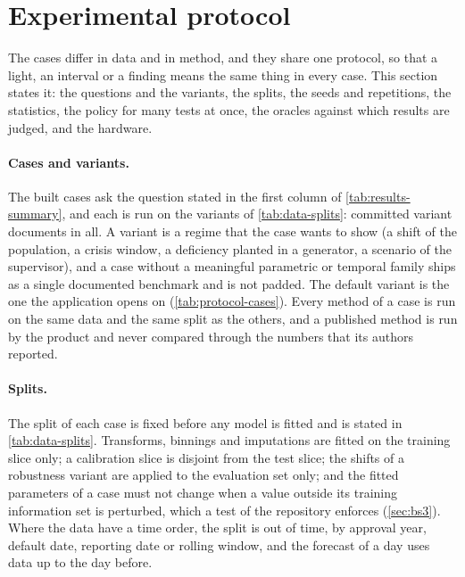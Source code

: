 \section{Experimental protocol}
\label{sec:protocol}

The cases differ in data and in method, and they share one protocol, so that a light, an interval or a finding means the same thing in every case. This section states it: the questions and the
variants, the splits, the seeds and repetitions, the statistics, the policy for many tests at once, the oracles against which results are judged, and the hardware.

\paragraph{Cases and variants.} The \rsCasesResult{} built cases ask the question stated in the first column of \cref{tab:results-summary}, and each is run on the variants of \cref{tab:data-splits}: \rsVariants{} committed variant documents in all. A variant is a regime
that the case wants to show (a shift of the population, a crisis window, a deficiency planted in a generator, a scenario of the supervisor), and a case without a meaningful parametric or temporal family ships as a single documented benchmark and is not padded. The default variant
is the one the application opens on (\cref{tab:protocol-cases}). Every method of a case is run on the same data and the same split as the others, and a published method is run by the product and never compared through the numbers that its authors reported.



\paragraph{Splits.} The split of each case is fixed before any model is fitted and is stated in \cref{tab:data-splits}. Transforms, binnings and imputations are fitted on the training slice only; a calibration slice is disjoint from the test slice; the shifts of a
robustness variant are applied to the evaluation set only; and the fitted parameters of a case must not change when a value outside its training information set is perturbed, which a test of the repository enforces (\cref{sec:bs3}). Where the data have a time order, the split is out of time, by approval year, default date,
reporting date or rolling window, and the forecast of a day uses data up to the day before.

